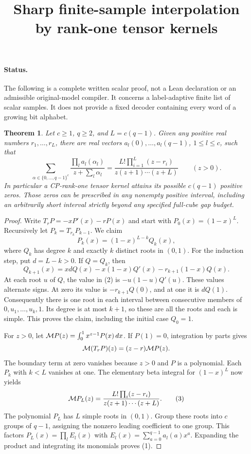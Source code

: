 \documentclass{article}
\newtheorem{theorem}{Theorem}
\begin{document}
\title{Sharp finite-sample interpolation by rank-one tensor kernels}
\maketitle

\paragraph{Status.}
The following is a complete written scalar proof, not a Lean
declaration or an admissible original-model compiler.  It concerns a
label-adaptive finite list of scalar samples.  It does not provide a
fixed decoder containing every word of a growing bit alphabet.

\begin{theorem}
Let $c\geq1$, $q\geq2$, and $L=c(q-1)$.  Given any positive real
numbers $r_1,\ldots,r_L$, there are real vectors
$a_l(0),\ldots,a_l(q-1)$, $1\leq l\leq c$, such that
\[
 \sum_{\alpha\in\{0,\ldots,q-1\}^c}
 \frac{\prod_l a_l(\alpha_l)}{z+\sum_l\alpha_l}
 =\frac{L!\prod_{i=1}^L(z-r_i)}{z(z+1)\cdots(z+L)}
 \qquad(z>0).                                      \tag{1}
\]
In particular a CP-rank-one tensor kernel attains its possible
$c(q-1)$ positive zeros.  Those zeros can be prescribed in any
nonempty positive interval, including an arbitrarily short interval
strictly beyond any specified full-cube gap budget.
\end{theorem}

\begin{proof}
Write $T_rP=-xP'(x)-rP(x)$ and start with $P_0(x)=(1-x)^L$.
Recursively let $P_k=T_{r_k}P_{k-1}$.  We claim
\[
 P_k(x)=(1-x)^{L-k}Q_k(x),
\]
where $Q_k$ has degree $k$ and exactly $k$ distinct roots in $(0,1)$.
For the induction step, put $d=L-k>0$.  If $Q=Q_k$, then
\[
 Q_{k+1}(x)=xdQ(x)-x(1-x)Q'(x)-r_{k+1}(1-x)Q(x).    \tag{2}
\]
At each root $u$ of $Q$, the value in (2) is
$-u(1-u)Q'(u)$.  These values alternate signs.  At zero its value is
$-r_{k+1}Q(0)$, and at one it is $dQ(1)$.  Consequently there is one
root in each interval between consecutive members of
$0,u_1,\ldots,u_k,1$.  Its degree is at most $k+1$, so these are all
the roots and each is simple.  This proves the claim, including the
initial case $Q_0=1$.

For $z>0$, let ${\cal M}P(z)=\int_0^1x^{z-1}P(x)\,dx$.
If $P(1)=0$, integration by parts gives
\[
 {\cal M}(T_rP)(z)=(z-r){\cal M}P(z).
\]
The boundary term at zero vanishes because $z>0$ and $P$ is a
polynomial.  Each $P_k$ with $k<L$ vanishes at one.  The elementary
beta integral for $(1-x)^L$ now yields
\[
 {\cal M}P_L(z)
 =\frac{L!\prod_i(z-r_i)}{z(z+1)\cdots(z+L)}.       \tag{3}
\]
The polynomial $P_L$ has $L$ simple roots in $(0,1)$.  Group these
roots into $c$ groups of $q-1$, assigning the nonzero leading
coefficient to one group.  This factors
$P_L(x)=\prod_l E_l(x)$ with
$E_l(x)=\sum_{a=0}^{q-1}a_l(a)x^a$.
Expanding the product and integrating its monomials proves (1).
\end{proof}
\end{document}

